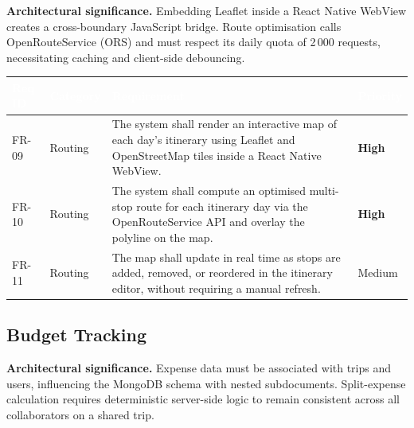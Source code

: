 \documentclass[12pt, a4paper]{article}
\newcommand{\reqid}[1]{\textsc{\small #1}}
\newcommand{\high}{\textbf{High}}
\newcommand{\medium}{Medium}
\newcommand{\thcell}[1]{\textcolor{white}{\textbf{\small #1}}}
\begin{document}
\begin{tcolorbox}[notebox]
  \textbf{Architectural significance.} Embedding Leaflet inside a React Native WebView creates a cross-boundary JavaScript bridge. Route optimisation calls OpenRouteService (ORS) and must respect its daily quota of 2\,000 requests, necessitating caching and client-side debouncing.
\end{tcolorbox}

\vspace{0.4em}
\begin{longtable}{C{1.6cm} C{2.0cm} L{8.2cm} C{1.8cm}}
\toprule
{}
\thcell{Req ID} & \thcell{Category} & \thcell{Requirement} & \thcell{Priority} \\
\midrule
\endhead
\bottomrule
\endfoot

\reqid{FR-09} & Routing &
The system shall render an interactive map of each day's itinerary using Leaflet and OpenStreetMap tiles inside a React Native WebView. &
\high \\

\reqid{FR-10} & Routing &
The system shall compute an optimised multi-stop route for each itinerary day via the OpenRouteService API and overlay the polyline on the map. &
\high \\

\reqid{FR-11} & Routing &
The map shall update in real time as stops are added, removed, or reordered in the itinerary editor, without requiring a manual refresh. &
\medium \\

\end{longtable}

\subsection{Budget Tracking}

\begin{tcolorbox}[notebox]
  \textbf{Architectural significance.} Expense data must be associated with trips and users, influencing the MongoDB schema with nested subdocuments. Split-expense calculation requires deterministic server-side logic to remain consistent across all collaborators on a shared trip.
\end{tcolorbox}
\end{document}
